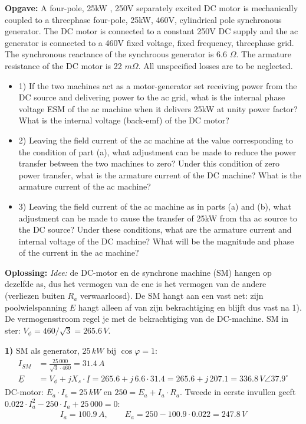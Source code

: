 \begin{oefenblok}
\textbf{Opgave:}
\newline
A four-pole, 25kW , 250V separately excited DC motor is mechanically coupled to a
threephase four-pole, 25kW, 460V, cylindrical pole synchronous generator.
The DC motor is connected to a constant 250V DC supply and the ac generator is connected
to a 460V fixed voltage, fixed frequency, threephase grid.
The synchronous reactance of the synchroous generator is 6.6 $\Omega$.
The armature resistance of the DC motor is 22 $m\Omega$.
All unspecified losses are to be neglected.
\begin{itemize}
 \item 1) If the two machines act as a motor-generator set receiving power from the DC
 source and delivering power to the ac grid, what is the internal phase voltage ESM of the
 ac machine when it delivers 25kW at unity power factor?
 What is the internal voltage (back-emf) of the DC motor?
 \item 2) Leaving the field current of the ac machine at the value corresponding to the
 condition of part (a), what adjustment can be made to reduce the power transfer between
 the two machines to zero?
 Under this condition of zero power transfer, what is the armature current of the DC
 machine?
 What is the armature current of the ac machine?
 \item 3) Leaving the field current of the ac machine as in parts (a) and (b), what
 adjustment can be made to cause the transfer of 25kW from tha ac source to the DC source?
 Under these conditions, what are the armature current and internal voltage of the DC
 machine?
 What will be the magnitude and phase of the current in the ac machine?
\end{itemize}
\textbf{Oplossing:}
\textit{Idee:} de DC-motor en de synchrone machine (SM) hangen op dezelfde as, dus het
vermogen van de ene is het vermogen van de andere (verliezen buiten $R_a$ verwaarloosd).
De SM hangt aan een vast net: zijn poolwielspanning $E$ hangt alleen af van zijn
bekrachtiging en blijft dus vast na 1).
De vermogensstroom regel je met de bekrachtiging van de DC-machine.
SM in ster: $V_\phi = 460/\sqrt{3} = 265.6\,V$.

\textbf{1)} SM als generator, $25\,kW$ bij $\cos\varphi = 1$:
\begin{align}
    I_{SM} &= \frac{25\,000}{\sqrt{3} \cdot 460} = 31.4\,A \tag{1} \\
    \underline{E} &= V_\phi + jX_s \cdot \underline{I} = 265.6 + j\,6.6 \cdot 31.4
    = 265.6 + j\,207.1 = 336.8\,V \angle 37.9^\circ \tag{2}
\end{align}
DC-motor: $E_a \cdot I_a = 25\,kW$ en $250 = E_a + I_a \cdot R_a$.
Tweede in eerste invullen geeft $0.022 \cdot I_a^2 - 250 \cdot I_a + 25\,000 = 0$:
\begin{align}
    I_a = 100.9\,A, \qquad E_a = 250 - 100.9 \cdot 0.022 = 247.8\,V \tag{3}
\end{align}


\end{oefenblok}
